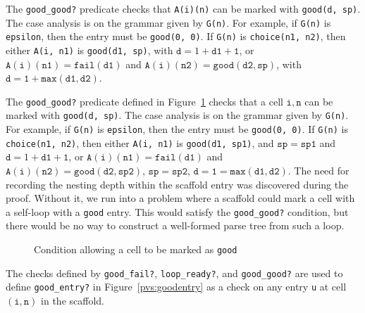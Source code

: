 \documentclass[sigplan,10pt,anonymous,review]{acmart}\settopmatter{printfolios=true,printccs=false,printacmref=false}
\begin{document}
% 			

                      The \texttt{good\_good?} predicate checks that \texttt{A(i)(n)} can be marked
                      with \texttt{good(d, sp)}\@.  The case analysis is on the grammar given by \texttt{G(n)}\@.  For example, if \texttt{G(n)} is \texttt{epsilon}, then the entry must be \texttt{good(0, 0)}\@.  If \texttt{G(n)} is \texttt{choice(n1, n2)}, then either \texttt{A(i, n1)} is \texttt{good(d1, sp)}, with $\mathtt{d} = 1 + \mathtt{d1 + 1}$, or
$\mathtt{A(i)(n1)} = \mathtt{fail(d1)}$ and $\mathtt{A(i)(n2)} = \mathtt{good(d2, sp)}$, with $\mathtt{d} = \mathtt{1 + max(d1, d2)}$\@.  
                      



The \texttt{good\_good?} predicate defined in
Figure~\ref{pvs:goodgood} checks that a cell $\mathtt{i, n}$ can be
marked with \texttt{good(d, sp)}\@.  The case analysis is on the
grammar given by \texttt{G(n)}\@.  For example, if \texttt{G(n)} is
\texttt{epsilon}, then the entry must be \texttt{good(0, 0)}\@.  If
\texttt{G(n)} is \texttt{choice(n1, n2)}, then either \texttt{A(i,
  n1)} is \texttt{good(d1, sp1)}, and $\mathtt{sp} = \mathtt{sp1}$ and
$\mathtt{d} = 1 + \mathtt{d1 + 1}$, or
$\mathtt{A(i)(n1)} = \mathtt{fail(d1)}$ and
$\mathtt{A(i)(n2)} = \mathtt{good(d2, sp2)}$,
$\mathtt{sp} = \mathtt{sp2}$,
$\mathtt{d} = \mathtt{1 = max(d1, d2)}$\@.
The need for recording the nesting depth within the scaffold entry was
discovered during the proof.  Without it, we run into a problem where
a scaffold could mark a cell with a self-loop with a \texttt{good} entry. 
This would satisfy the \texttt{good\_good?} condition, but there would be no
way to construct a well-formed parse tree from such a loop.  

\begin{figure}[h!]
  
    \vspace*{-4mm}
			\caption{Condition allowing a cell to be marked as \texttt{good}}
			\label{pvs:goodgood}
\end{figure}

The checks defined by \texttt{good\_fail?}, \texttt{loop\_ready?}, and \texttt{good\_good?} are used to define \texttt{good\_entry?} in Figure~\ref{pvs:goodentry}
as a check on any entry \texttt{u}
at cell $(\mathtt{i, n})$ in the scaffold.  
\end{document}
